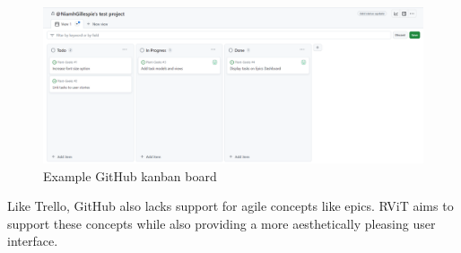 \documentclass[l4proj.tex]{subfiles}
\begin{document}
\begin{figure}[h!]
\begin{center}
\includegraphics[scale=0.35]{dissertation/images/GitHubKanbanBoard.png}
\caption{Example GitHub kanban board}
\label{fig:GitHub kanban} 
\end{center}
\end{figure}


Like Trello, GitHub also lacks support for agile concepts like epics. RViT aims to support these concepts while also providing a more aesthetically pleasing user interface. 
\end{document}
